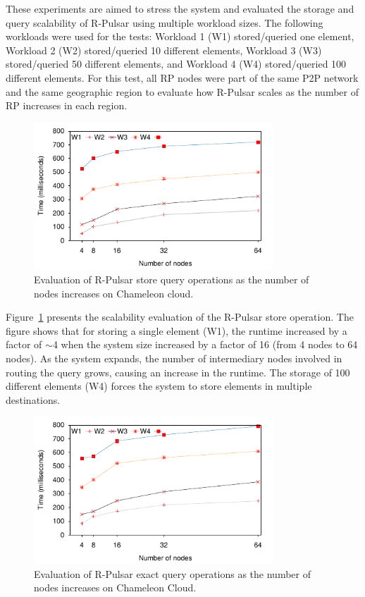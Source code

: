 These experiments are aimed to stress the system and evaluated the storage and query scalability of R-Pulsar using multiple workload sizes. The following workloads were used for the tests: Workload 1 (W1) stored/queried one element, Workload 2 (W2) stored/queried 10 different elements, Workload 3 (W3) stored/queried 50 different elements, and Workload 4 (W4) stored/queried 100 different elements. For this test, all RP nodes were part of the same P2P network and the same geographic region to evaluate how R-Pulsar scales as the number of RP increases in each region. 

\begin{figure}[h!]
  \centering
  \includegraphics[width=0.8\textwidth]{Results/ProducerLine.pdf}
  \caption{Evaluation of R-Pulsar store query operations as the number of nodes increases on Chameleon cloud.}
  \label{fig:ProducerLine}
\end{figure}

Figure~\ref{fig:ProducerLine} presents the scalability evaluation of the R-Pulsar store operation. The figure shows that for storing a single element (W1), the runtime increased by a factor of $\sim$4 when the system size increased by a factor of 16 (from 4 nodes to 64 nodes). As the system expands, the number of intermediary nodes involved in routing the query grows, causing an increase in the runtime. The storage of 100 different elements (W4) forces the system to store elements in multiple destinations.

\begin{figure}[h!]
  \centering
  \includegraphics[width=0.8\textwidth]{Results/ProducerLineEx.pdf}
  \caption{Evaluation of R-Pulsar exact query operations as the number of nodes increases on Chameleon Cloud.}
  \label{fig:ProducerLineEx}
\end{figure}


